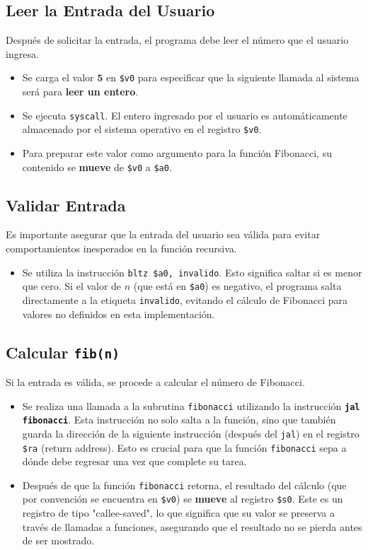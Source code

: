 \documentclass{article}
\begin{document}
\subsection*{Leer la Entrada del Usuario}
Después de solicitar la entrada, el programa debe leer el número que el usuario ingresa.
\begin{itemize}
    \item Se carga el valor $\mathbf{5}$ en \texttt{\$v0} para especificar que la siguiente llamada al sistema será para \textbf{leer un entero}.
    \item Se ejecuta \texttt{syscall}. El entero ingresado por el usuario es automáticamente almacenado por el sistema operativo en el registro \texttt{\$v0}.
    \item Para preparar este valor como argumento para la función Fibonacci, su contenido se \textbf{mueve} de \texttt{\$v0} a \texttt{\$a0}.
\end{itemize}

\subsection*{Validar Entrada}
Es importante asegurar que la entrada del usuario sea válida para evitar comportamientos inesperados en la función recursiva.
\begin{itemize}
    \item Se utiliza la instrucción \texttt{bltz \$a0, invalido}. Esto significa saltar si es menor que cero. Si el valor de $n$ (que está en \texttt{\$a0}) es negativo, el programa salta directamente a la etiqueta \texttt{invalido}, evitando el cálculo de Fibonacci para valores no definidos en esta implementación.
\end{itemize}

\subsection*{Calcular \texttt{fib(n)}}
Si la entrada es válida, se procede a calcular el número de Fibonacci.
\begin{itemize}
    \item Se realiza una llamada a la subrutina \texttt{fibonacci} utilizando la instrucción \textbf{\texttt{jal fibonacci}}. Esta instrucción no solo salta a la función, sino que también guarda la dirección de la siguiente instrucción (después del \texttt{jal}) en el registro \texttt{\$ra} (return address). Esto es crucial para que la función \texttt{fibonacci} sepa a dónde debe regresar una vez que complete su tarea.
    \item Después de que la función \texttt{fibonacci} retorna, el resultado del cálculo (que por convención se encuentra en \texttt{\$v0}) se \textbf{mueve} al registro \texttt{\$s0}. Este es un registro de tipo "callee-saved", lo que significa que su valor se preserva a través de llamadas a funciones, asegurando que el resultado no se pierda antes de ser mostrado.
\end{itemize}
\end{document}
